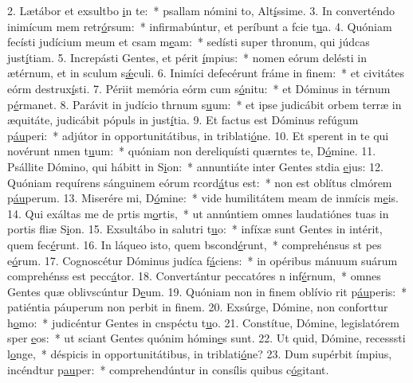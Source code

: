 2. Lætábor et exsultbo \uline{i}n te:~* psallam nómini to, Alt\uline{í}ssime.
3. In converténdo inimícum mem retr\uline{ó}rsum:~* infirmabúntur, et períbunt a fcie t\uline{u}a.
4. Quóniam fecísti judícium meum et csam m\uline{e}am:~* sedísti super thronum, qui júdcas just\uline{í}tiam.
5. Increpásti Gentes, et périt \uline{í}mpius:~* nomen eórum delésti in ætérnum, et in sculum s\uline{ǽ}culi.
6. Inimíci defecérunt fráme in f\uline{i}nem:~* et civitátes eórm destrux\uline{í}sti.
7. Périit memória eórm cum s\uline{ó}nitu:~* et Dóminus in térnum p\uline{é}rmanet.
8. Parávit in judício thrnum s\uline{u}um:~* et ipse judicábit orbem terræ in æquitáte, judicábit pópuls in just\uline{í}tia.
9. Et factus est Dóminus refúgum p\uline{áu}peri:~* adjútor in opportunitátibus, in triblati\uline{ó}ne.
10. Et sperent in te qui novérunt nmen t\uline{u}um:~* quóniam non dereliquísti quærntes te, D\uline{ó}mine.
11. Psállite Dómino, qui hábitt in S\uline{i}on:~* annuntiáte inter Gentes stdia \uline{e}jus:
12. Quóniam requírens sánguinem eórum rcord\uline{á}tus est:~* non est oblítus clmórem p\uline{áu}perum.
13. Miserére mi, D\uline{ó}mine:~* vide humilitátem meam de inmícis m\uline{e}is.
14. Qui exáltas me de prtis m\uline{o}rtis,~* ut annúntiem omnes laudatiónes tuas in portis fliæ S\uline{i}on.
15. Exsultábo in salutri t\uline{u}o:~* infíxæ sunt Gentes in intérit, quem fec\uline{é}runt.
16. In láqueo isto, quem bscond\uline{é}runt,~* comprehénsus st pes e\uline{ó}rum.
17. Cognoscétur Dóminus judíca f\uline{á}ciens:~* in opéribus mánuum suárum comprehénss est pecc\uline{á}tor.
18. Convertántur peccatóres n inf\uline{é}rnum,~* omnes Gentes quæ oblivscúntur D\uline{e}um.
19. Quóniam non in finem oblívio rit p\uline{áu}peris:~* patiéntia páuperum non perbit in f\uline{i}nem.
20. Exsúrge, Dómine, non conforttur h\uline{o}mo:~* judicéntur Gentes in cnspéctu t\uline{u}o.
21. Constítue, Dómine, legislatórem sper \uline{e}os:~* ut sciant Gentes quónim hómin\uline{e}s sunt.
22. Ut quid, Dómine, recesssti l\uline{o}nge,~* déspicis in opportunitátibus, in triblati\uline{ó}ne?
23. Dum supérbit ímpius, incéndtur p\uline{au}per:~* comprehendúntur in consílis quibus c\uline{ó}gitant.
